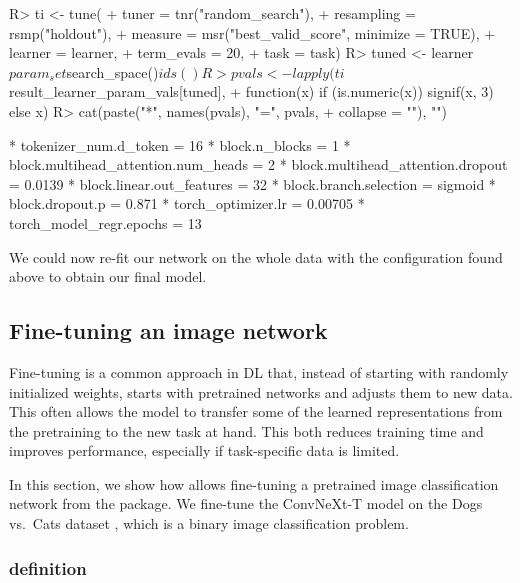 \documentclass[article,shortnames]{jss}
\theoremstyle{definition}
\renewenvironment{CodeChunk}{\par\addvspace{0.6\baselineskip}\noindent\begin{minipage}{\linewidth}}{\end{minipage}\par\vspace{0.6\baselineskip}}
\begin{document}
\begin{CodeChunk}
\begin{CodeInput}
R> ti <- tune(
+    tuner = tnr("random_search"),
+    resampling = rsmp("holdout"),
+    measure = msr("best_valid_score", minimize = TRUE),
+    learner = learner,
+    term_evals = 20,
+    task = task)
R> tuned <- learner$param_set$search_space()$ids()
R> pvals <- lapply(ti$result_learner_param_vals[tuned],
+    function(x) if (is.numeric(x)) signif(x, 3) else x)
R> cat(paste("*", names(pvals), "=", pvals,
+    collapse = "\n"), "\n")
\end{CodeInput}
\begin{CodeOutput}
* tokenizer_num.d_token = 16
* block.n_blocks = 1
* block.multihead_attention.num_heads = 2
* block.multihead_attention.dropout = 0.0139
* block.linear.out_features = 32
* block.branch.selection = sigmoid
* block.dropout.p = 0.871
* torch_optimizer.lr = 0.00705
* torch_model_regr.epochs = 13
\end{CodeOutput}
\end{CodeChunk}

We could now re-fit our network on the whole data with the configuration found above to obtain our final model.

\subsection{Fine-tuning an image network}\label{sec:finetuning}\nopagebreak

Fine-tuning is a common approach in DL that, instead of starting with randomly initialized weights, starts with pretrained networks and adjusts them to new data.
This often allows the model to transfer some of the learned representations from the pretraining to the new task at hand.
This both reduces training time and improves performance, especially if task-specific data is limited.

In this section, we show how  allows fine-tuning a pretrained image classification network from the  package.
We fine-tune the ConvNeXt-T model \citep{ref-liu2022convnet} on the Dogs vs.\ Cats dataset \citep{ref-dogs-vs-cats2013}, which is a binary image classification problem.

\subsubsection[Task definition]{ definition}
\end{document}
